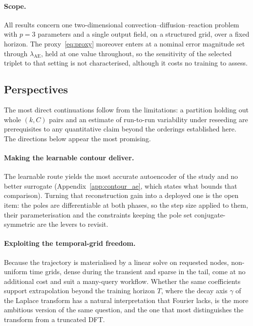 ﻿\documentclass[a4paper,12pt]{article}
\theoremstyle{definition}
\theoremstyle{remark}
\begin{document}
\paragraph{Scope.}
All results concern one two-dimensional convection--diffusion--reaction problem with $p = 3$ parameters and a single output field, on a structured grid, over a fixed horizon. The proxy~\eqref{eq:proxy} moreover enters at a nominal error magnitude set through $\lambda_{\mathrm{AE}}$, held at one value throughout, so the sensitivity of the selected triplet to that setting is not characterised, although it costs no training to assess.

\subsection{Perspectives}
\label{sec:perspectives}

The most direct continuations follow from the limitations: a partition holding out whole $(k,C)$ pairs and an estimate of run-to-run variability under reseeding are prerequisites to any quantitative claim beyond the orderings established here. The directions below appear the most promising.

\paragraph{Making the learnable contour deliver.}
The learnable route yields the most accurate autoencoder of the study and no better surrogate (Appendix~\ref{app:contour_ae}, which states what bounds that comparison). Turning that reconstruction gain into a deployed one is the open item: the poles are differentiable at both phases, so the step size applied to them, their parameterisation and the constraints keeping the pole set conjugate-symmetric are the levers to revisit.

\paragraph{Exploiting the temporal-grid freedom.}
Because the trajectory is materialised by a linear solve on requested nodes, non-uniform time grids, dense during the transient and sparse in the tail, come at no additional cost and suit a many-query workflow. Whether the same coefficients support extrapolation beyond the training horizon $T$, where the decay axis $\gamma$ of the Laplace transform has a natural interpretation that Fourier lacks, is the more ambitious version of the same question, and the one that most distinguishes the transform from a truncated DFT.
\end{document}
